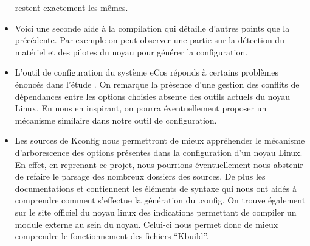 \documentclass[16pts]{report}
\begin{document}
\begin{itemize}
        restent exactement les mêmes.
    \item Voici une seconde aide \cite{Existant:Kernel:outils} à la compilation 
        qui détaille d’autres points que la précédente.  Par exemple on peut
        observer une partie sur la détection du matériel et des pilotes du noyau
        pour générer la configuration.
    \item L’outil de configuration du système eCos \cite{Existant:EcosConfig}
        réponds à certains problèmes énoncés dans l’étude
        \cite{Hubaux:2012:USC:2110147.2110164}. On remarque la présence d’une
        gestion des conflits de dépendances entre les options choisies absente
        des outils actuels du noyau Linux. En nous en inspirant, on pourra
        éventuellement proposer un mécanisme similaire dans notre outil de
        configuration.
    \item Les sources de Kconfig \cite{Existant:Kconfig:frontends} nous
        permettront de mieux appréhender le mécanisme d'arborescence des options
        présentes dans la configuration d'un noyau Linux. En effet, en reprenant
        ce projet, nous pourrions éventuellement nous abstenir de refaire le
        parsage des nombreux dossiers des sources. De plus les documentations
        \cite{Existant:Kconfig:vueDensemble} et \cite{Existant:Kconfig:langage}
        contiennent les éléments de syntaxe qui nous ont aidés à comprendre
        comment s'effectue la génération du .config. On trouve également sur le
        site officiel du noyau linux des indications
        \cite{Existant:Kconfig:modules} permettant de compiler un module externe
        au sein du noyau. Celui-ci nous permet donc de mieux comprendre le
        fonctionnement des fichiers “Kbuild”.

\end{itemize}



\end{document}
